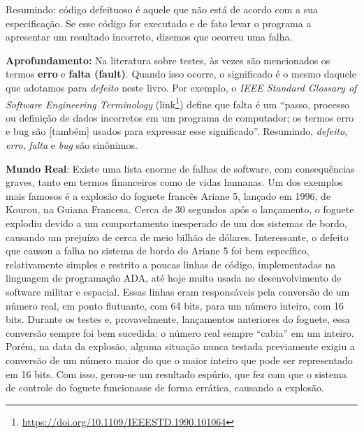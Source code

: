 \documentclass[
  11pt,
  twoside]{book}
\DeclareRobustCommand{\href}[2]{#2\footnote{\url{#1}}}
\newenvironment{esmbox}{\centering \vspace{1.5ex} \begin{tcolorbox}[breakable, colback=backcolor, width=4.9in]}{\end{tcolorbox} \vspace{1.5ex}}
\begin{document}
Resumindo: código defeituoso é aquele que não está de acordo com a sua
especificação. Se esse código for executado e de fato levar o programa a
apresentar um resultado incorreto, dizemos que ocorreu uma falha.

\begin{esmbox}

\textbf{Aprofundamento:} Na literatura sobre testes, às vezes são
mencionados os termos \textbf{erro} e \textbf{falta (fault)}. Quando
isso ocorre, o significado é o mesmo daquele que adotamos para
\emph{defeito} neste livro. Por exemplo, o \emph{IEEE Standard Glossary
of Software Engineering Terminology}
(\href{https://doi.org/10.1109/IEEESTD.1990.101064}{link}) define que
falta é um ``passo, processo ou definição de dados incorretos em um
programa de computador; os termos erro e bug são {[}também{]} usados
para expressar esse significado''. Resumindo, \emph{defeito},
\emph{erro}, \emph{falta} e \emph{bug} são sinônimos.

\end{esmbox}


\begin{esmbox}

\textbf{Mundo Real}: Existe uma lista enorme de falhas de software, com
consequências graves, tanto em termos financeiros como de vidas humanas.
Um dos exemplos mais famosos é a explosão do foguete francês Ariane 5,
lançado em 1996, de Kourou, na Guiana Francesa. Cerca de 30 segundos
após o lançamento, o foguete explodiu devido a um comportamento
inesperado de um dos sistemas de bordo, causando um prejuízo de cerca de
meio bilhão de dólares. Interessante, o defeito que causou a falha no
sistema de bordo do Ariane 5 foi bem específico, relativamente simples e
restrito a poucas linhas de código, implementadas na linguagem de
programação ADA, até hoje muito usada no desenvolvimento de software
militar e espacial. Essas linhas eram responsáveis pela conversão de um
número real, em ponto flutuante, com 64 bits, para um número inteiro,
com 16 bits. Durante os testes e, provavelmente, lançamentos anteriores
do foguete, essa conversão sempre foi bem sucedida: o número real sempre
``cabia'' em um inteiro. Porém, na data da explosão, alguma situação
nunca testada previamente exigiu a conversão de um número maior do que o
maior inteiro que pode ser representado em 16 bits. Com isso, gerou-se
um resultado espúrio, que fez com que o sistema de controle do foguete
funcionasse de forma errática, causando a explosão.

\end{esmbox}
\end{document}
